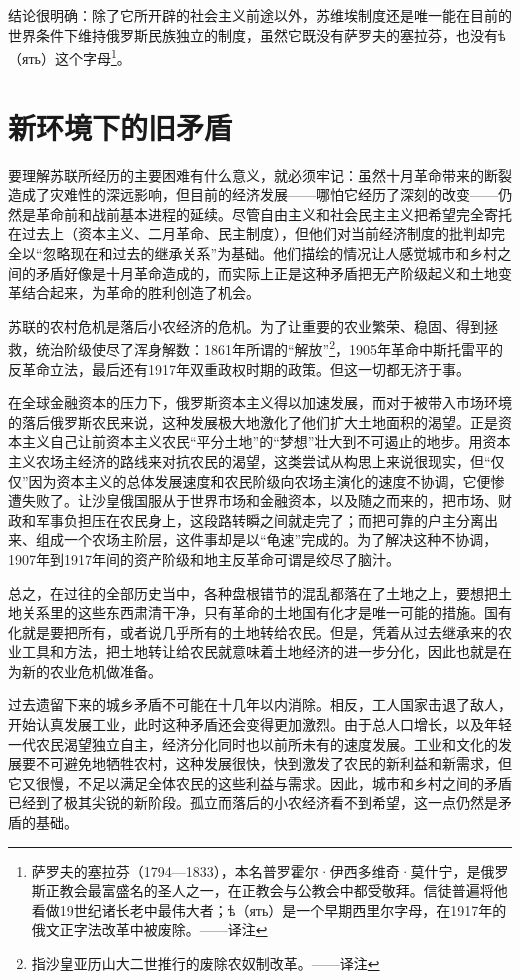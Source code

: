 \documentclass[UTF8, 12pt, a4paper]{ctexrep}
\begin{document}
结论很明确：除了它所开辟的社会主义前途以外，苏维埃制度还是唯一能在目前的世界条件下维持俄罗斯民族独立的制度，虽然它既没有萨罗夫的塞拉芬，也没有ѣ（ять）这个字母\footnote{萨罗夫的塞拉芬（1794—1833），本名普罗霍尔·伊西多维奇·莫什宁，是俄罗斯正教会最富盛名的圣人之一，在正教会与公教会中都受敬拜。信徒普遍将他看做19世纪诸长老中最伟大者；ѣ（ять）是一个早期西里尔字母，在1917年的俄文正字法改革中被废除。——译注}。

\section{新环境下的旧矛盾}

要理解苏联所经历的主要困难有什么意义，就必须牢记：虽然十月革命带来的断裂造成了灾难性的深远影响，但目前的经济发展——哪怕它经历了深刻的改变——仍然是革命前和战前基本进程的延续。尽管自由主义和社会民主主义把希望完全寄托在过去上（资本主义、二月革命、民主制度），但他们对当前经济制度的批判却完全以“忽略现在和过去的继承关系”为基础。他们描绘的情况让人感觉城市和乡村之间的矛盾好像是十月革命造成的，而实际上正是这种矛盾把无产阶级起义和土地变革结合起来，为革命的胜利创造了机会。

苏联的农村危机是落后小农经济的危机。为了让重要的农业繁荣、稳固、得到拯救，统治阶级使尽了浑身解数：1861年所谓的“解放”\footnote{指沙皇亚历山大二世推行的废除农奴制改革。——译注}，1905年革命中斯托雷平的反革命立法，最后还有1917年双重政权时期的政策。但这一切都无济于事。

在全球金融资本的压力下，俄罗斯资本主义得以加速发展，而对于被带入市场环境的落后俄罗斯农民来说，这种发展极大地激化了他们扩大土地面积的渴望。正是资本主义自己让前资本主义农民“平分土地”的“梦想”壮大到不可遏止的地步。用资本主义农场主经济的路线来对抗农民的渴望，这类尝试从构思上来说很现实，但“仅仅”因为资本主义的总体发展速度和农民阶级向农场主演化的速度不协调，它便惨遭失败了。让沙皇俄国服从于世界市场和金融资本，以及随之而来的，把市场、财政和军事负担压在农民身上，这段路转瞬之间就走完了；而把可靠的户主分离出来、组成一个农场主阶层，这件事却是以“龟速”完成的。为了解决这种不协调，1907年到1917年间的资产阶级和地主反革命可谓是绞尽了脑汁。

总之，在过往的全部历史当中，各种盘根错节的混乱都落在了土地之上，要想把土地关系里的这些东西肃清干净，只有革命的土地国有化才是唯一可能的措施。国有化就是要把所有，或者说几乎所有的土地转给农民。但是，凭着从过去继承来的农业工具和方法，把土地转让给农民就意味着土地经济的进一步分化，因此也就是在为新的农业危机做准备。

过去遗留下来的城乡矛盾不可能在十几年以内消除。相反，工人国家击退了敌人，开始认真发展工业，此时这种矛盾还会变得更加激烈。由于总人口增长，以及年轻一代农民渴望独立自主，经济分化同时也以前所未有的速度发展。工业和文化的发展要不可避免地牺牲农村，这种发展很快，快到激发了农民的新利益和新需求，但它又很慢，不足以满足全体农民的这些利益与需求。因此，城市和乡村之间的矛盾已经到了极其尖锐的新阶段。孤立而落后的小农经济看不到希望，这一点仍然是矛盾的基础。
\end{document}
